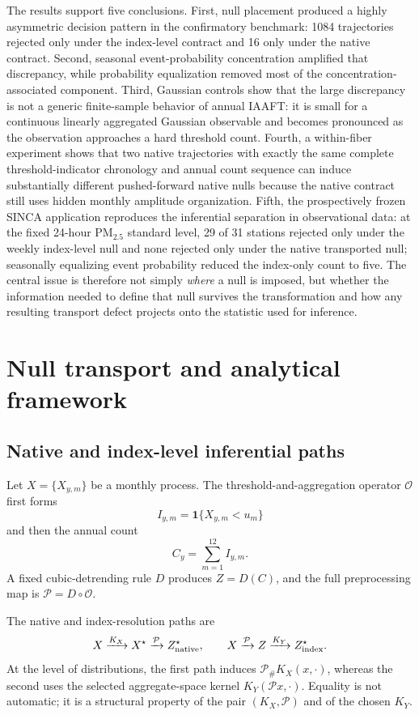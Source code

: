 The results support five conclusions. First, null placement produced a highly asymmetric decision pattern in the confirmatory benchmark: 1084 trajectories rejected only under the index-level contract and 16 only under the native contract. Second, seasonal event-probability concentration amplified that discrepancy, while probability equalization removed most of the concentration-associated component. Third, Gaussian controls show that the large discrepancy is not a generic finite-sample behavior of annual IAAFT: it is small for a continuous linearly aggregated Gaussian observable and becomes pronounced as the observation approaches a hard threshold count. Fourth, a within-fiber experiment shows that two native trajectories with exactly the same complete threshold-indicator chronology and annual count sequence can induce substantially different pushed-forward native nulls because the native contract still uses hidden monthly amplitude organization. Fifth, the prospectively frozen SINCA application reproduces the inferential separation in observational data: at the fixed 24-hour PM$_{2.5}$ standard level, 29 of 31 stations rejected only under the weekly index-level null and none rejected only under the native transported null; seasonally equalizing event probability reduced the index-only count to five. The central issue is therefore not simply \emph{where} a null is imposed, but whether the information needed to define that null survives the transformation and how any resulting transport defect projects onto the statistic used for inference.

\section{Null transport and analytical framework}\label{sec:theory}

\subsection{Native and index-level inferential paths}\label{sec:paths}

Let $X=\{X_{y,m}\}$ be a monthly process. The threshold-and-aggregation operator $\mathcal O$ first forms
\[
I_{y,m}=\mathbf 1\{X_{y,m}<u_m\}
\]
and then the annual count
\[
C_y=\sum_{m=1}^{12}I_{y,m}.
\]
A fixed cubic-detrending rule $D$ produces $Z=D(C)$, and the full preprocessing map is $\mathcal P=D\circ\mathcal O$.

The native and index-resolution paths are
\[
X\xrightarrow{K_X}X^\star\xrightarrow{\mathcal P}Z^\star_{\rm native},
\qquad
X\xrightarrow{\mathcal P}Z\xrightarrow{K_Y}Z^\star_{\rm index}.
\]
At the level of distributions, the first path induces $\mathcal P_\#K_X(x,\cdot)$, whereas the second uses the selected aggregate-space kernel $K_Y(\mathcal P x,\cdot)$. Equality is not automatic; it is a structural property of the pair $(K_X,\mathcal P)$ and of the chosen $K_Y$.

